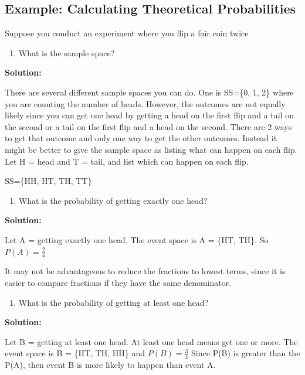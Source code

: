 \documentclass[
]{book}
\providecommand{\tightlist}{%
  \setlength{\itemsep}{0pt}\setlength{\parskip}{0pt}}
\begin{document}
\hypertarget{example-calculating-theoretical-probabilities}{%
\subsection{Example: Calculating Theoretical Probabilities}\label{example-calculating-theoretical-probabilities}}

Suppose you conduct an experiment where you flip a fair coin twice

\begin{enumerate}
\def\labelenumi{\alph{enumi}.}
\tightlist
\item
  What is the sample space?
\end{enumerate}

\textbf{Solution:}

There are several different sample spaces you can do. One is SS=\{0, 1, 2\} where you are counting the number of heads. However, the outcomes are not equally likely since you can get one head by getting a head on the first flip and a tail on the second or a tail on the first flip and a head on the second. There are 2 ways to get that outcome and only one way to get the other outcomes. Instead it might be better to give the sample space as listing what can happen on each flip. Let H = head and T = tail, and list which can happen on each flip.

SS=\{HH, HT, TH, TT\}

\begin{enumerate}
\def\labelenumi{\alph{enumi}.}
\setcounter{enumi}{1}
\tightlist
\item
  What is the probability of getting exactly one head?
\end{enumerate}

\textbf{Solution:}

Let A = getting exactly one head. The event space is A = \{HT, TH\}. So \(P(A)=\frac{2}{4}\)

It may not be advantageous to reduce the fractions to lowest terms, since it is easier to compare fractions if they have the same denominator.

\begin{enumerate}
\def\labelenumi{\alph{enumi}.}
\setcounter{enumi}{2}
\tightlist
\item
  What is the probability of getting at least one head?
\end{enumerate}

\textbf{Solution:}

Let B = getting at least one head. At least one head means get one or more. The event space is B = \{HT, TH, HH\} and \(P(B)=\frac{3}{4}\) Since P(B) is greater than the P(A), then event B is more likely to
happen than event A.
\end{document}
